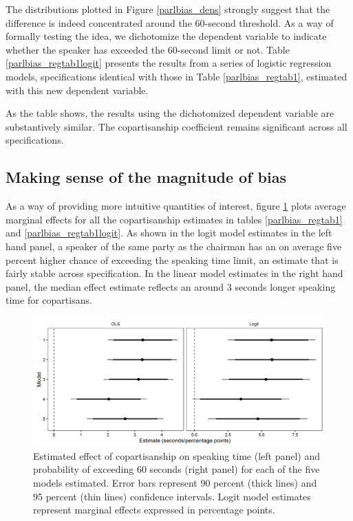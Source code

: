 \documentclass[12pt,a4paper]{article}
\begin{document}
The distributions plotted in Figure \ref{parlbias_dens} strongly suggest that the difference is indeed concentrated around the 60-second threshold. As a way of formally testing the idea, we dichotomize the dependent variable to indicate whether the speaker has exceeded the 60-second limit or not. Table \ref{parlbias_regtab1logit} presents the results from a series of logistic regression models, specifications identical with those in Table \ref{parlbias_regtab1}, estimated with this new dependent variable.



As the table shows, the results using the dichotomized dependent variable are substantively similar. The copartisanship coefficient remains significant across all specifications.

\subsection{Making sense of the magnitude of bias}
As a way of providing more intuitive quantities of interest, figure \ref{parlbias_effectplot} plots average marginal effects for all the copartisanship estimates in tables \ref{parlbias_regtab1} and \ref{parlbias_regtab1logit}. As shown in the logit model estimates in the left hand panel, a speaker of the same party as the chairman has an on average five percent higher chance of exceeding the speaking time limit, an estimate that is fairly stable across specification. In the linear model estimates in the right hand panel, the median effect estimate reflects an around 3 seconds longer speaking time for copartisans.

\begin{figure}[!htbp]
\centering
\includegraphics[scale=.65]{../figures/parlbias_effectplot.png}
  \caption{Estimated effect of copartisanship on speaking time (left panel) and probability of exceeding 60 seconds (right panel) for each of the five models estimated. Error bars represent 90 percent (thick lines) and 95 percent (thin lines) confidence intervals. Logit model estimates represent marginal effects expressed in percentage points.}\label{parlbias_effectplot}
\end{figure}
\end{document}
